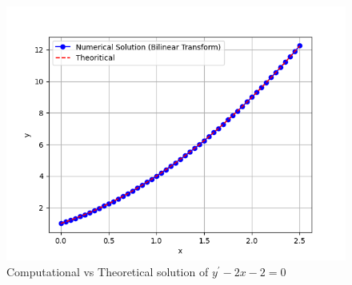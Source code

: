 \documentclass[journal]{IEEEtran}
\begin{document}
\begin{figure}[h!]
   \centering
   \includegraphics[width=1\columnwidth]{figs/fig.png}
   \caption{Computational vs Theoretical solution of $ y^\prime - 2x - 2 = 0$}
   \label{stemplot}
\end{figure}
\end{document}
